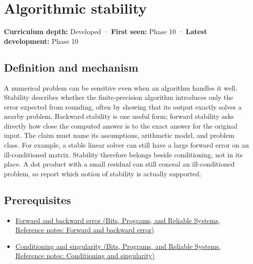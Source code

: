 \hypertarget{appendix-aa2bf0d79639}{}\label{referencestart:appendix-aa2bf0d79639}
\section{Algorithmic stability}\label{appendix-aa2bf0d79639-algorithmic-stability}

\textbf{Curriculum depth:} Developed · \textbf{First seen:} Phase 10 · \textbf{Latest development:} Phase 10

\begin{allmightroledefinition}

\subsection{Definition and mechanism}\label{appendix-aa2bf0d79639-definition-and-mechanism}

A numerical problem can be sensitive even when an algorithm handles it well. Stability describes whether the finite-precision algorithm introduces only the error expected from rounding, often by showing that its output exactly solves a nearby problem. Backward stability is one useful form; forward stability asks directly how close the computed answer is to the exact answer for the original input. The claim must name its assumptions, arithmetic model, and problem class. For example, a stable linear solver can still have a large forward error on an ill-conditioned matrix. Stability therefore belongs beside conditioning, not in its place. A dot product with a small residual can still conceal an ill-conditioned problem, so report which notion of stability is actually supported.

\end{allmightroledefinition}

\subsection{Prerequisites}\label{appendix-aa2bf0d79639-prerequisites}

\begin{itemize}
\tightlist
\item
  \href{../01-Bits-Programs-and-Reliable-Systems/main.pdf\#nameddest=appendix-a7fbaf6d1b1c}{Forward and backward error (Bits, Programs, and Reliable Systems, Reference notes: Forward and backward error)}
\item
  \href{../01-Bits-Programs-and-Reliable-Systems/main.pdf\#nameddest=appendix-8f6a01f284a7}{Conditioning and singularity (Bits, Programs, and Reliable Systems, Reference notes: Conditioning and singularity)}
\end{itemize}

